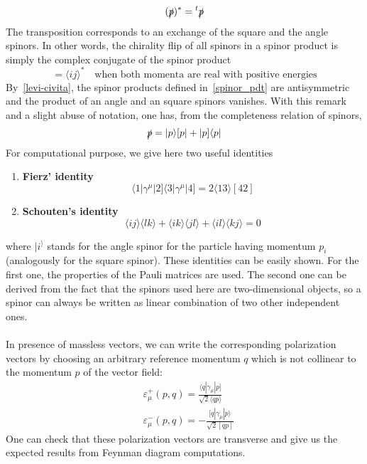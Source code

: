 \begin{equation}
(\slashed{p})^* = {}^t\slashed{p}
\end{equation}
The transposition corresponds to an exchange of the square and the angle spinors. 
In other words, the chirality flip of all spinors in a spinor product is simply the complex conjugate of the spinor product
\begin{equation}
[ij] = \langle ij \rangle^* \quad\textrm{when both momenta are real with positive energies}
\end{equation}
By~\cref{levi-civita}, the spinor products defined in~\cref{spinor_pdt} are antisymmetric and the product of an angle and an square spinors vanishes. 
With this remark and a slight abuse of notation, one has, from the completeness relation of spinors,
\begin{equation}\label{p_splinors}
\slashed{p} = |p\rangle [p| + |p]\langle p|
\end{equation}
For computational purpose, we give here two useful identities
\begin{enumerate}
\item \textbf{Fierz' identity} 
\begin{equation}\label{fierz_id}
\langle 1 |\gamma^\mu |2]\langle 3 |\gamma^\mu|4] = 2\langle 13 \rangle [42]
\end{equation}
\item \textbf{Schouten's identity} 
\begin{equation}
\langle ij \rangle \langle lk \rangle + \langle ik\rangle \langle jl\rangle + \langle il \rangle \langle kj \rangle = 0
\end{equation}
\end{enumerate}
where $|i^\rangle$ stands for the angle spinor for the particle having momentum $p_i$ (analogously for the square spinor). 
These identities can be easily shown.
For the first one, the properties of the Pauli matrices are used.
The second one can be derived from the fact that the spinors used here are two-dimensional objects, so a spinor can always be written as linear combination of two other independent ones.
%
\\\\
In presence of massless vectors, we can write the corresponding polarization vectors by choosing an arbitrary reference momentum $q$ which is not collinear to the momentum $p$ of the vector field:
\begin{equation}\label{pol_vec}
\begin{split}
& \varepsilon^+_\mu (p, q) = \frac{\langle q | \gamma_\mu |p]}{\sqrt{2}\langle qp \rangle}
\\
& \varepsilon^-_\mu (p, q) = -\frac{[q|\gamma_\mu | p\rangle}{\sqrt{2}[qp]}
\end{split}
\end{equation}
One can check that these polarization vectors are transverse and give us the expected results from Feynman diagram computations. 
%
%
